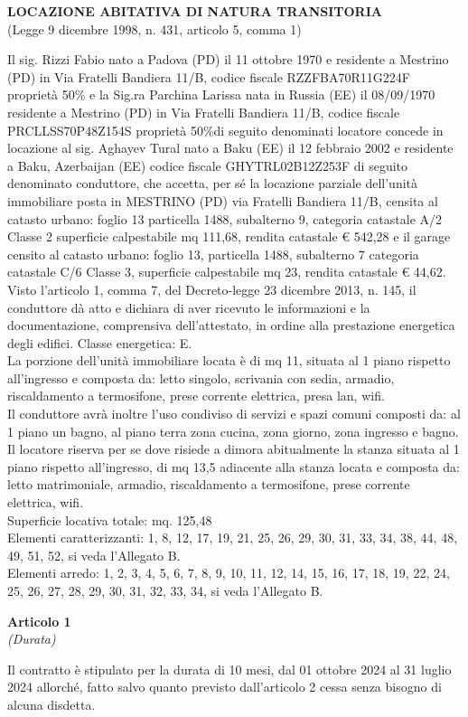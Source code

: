 \documentclass{contratto}
\begin{document}
\begin{center}
    \textbf{ LOCAZIONE ABITATIVA DI NATURA TRANSITORIA}\\
    \vspace{0.5cm}
   (Legge 9 dicembre 1998, n. 431, articolo 5, comma 1)
\end{center}

Il sig. Rizzi Fabio nato a Padova (PD) il 11 ottobre 1970 e residente a Mestrino (PD)  in Via Fratelli Bandiera 11/B, codice fiscale RZZFBA70R11G224F proprietà 50\% e la Sig.ra Parchina Larissa nata in Russia (EE) il 08/09/1970 residente a Mestrino (PD) in Via Fratelli Bandiera 11/B, codice fiscale PRCLLSS70P48Z154S proprietà 50\%di seguito denominati locatore concede in locazione al sig. Aghayev Tural nato a Baku (EE) il 12 febbraio 2002 e residente a Baku, Azerbaijan (EE) codice fiscale GHYTRL02B12Z253F di seguito denominato conduttore,  che accetta, per sé  la locazione parziale dell'unità immobiliare posta in MESTRINO (PD) via Fratelli Bandiera 11/B, censita al catasto urbano: foglio 13 particella 1488, subalterno 9, categoria catastale A/2 Classe 2 superficie calpestabile mq 111,68, rendita catastale € 542,28 e il garage censito al catasto urbano: foglio 13, particella 1488, subalterno 7 categoria catastale C/6 Classe 3, superficie calpestabile mq 23, rendita catastale € 44,62.
Visto l’articolo 1, comma 7, del Decreto-legge 23 dicembre 2013, n. 145, il conduttore dà atto e dichiara di aver ricevuto le informazioni e la documentazione, comprensiva dell'attestato, in ordine alla prestazione energetica degli edifici. Classe energetica: E.\\
La porzione dell’unità immobiliare locata è di mq 11, situata al 1 piano rispetto all'ingresso e composta da: letto singolo, scrivania con sedia, armadio, riscaldamento a termosifone, prese corrente elettrica, presa lan, wifi.\\
Il conduttore avrà inoltre l’uso condiviso di servizi e spazi comuni composti da: al 1 piano un bagno, al piano terra  zona cucina, zona giorno, zona ingresso e bagno.\\
Il locatore riserva per se dove risiede a dimora abitualmente la stanza situata al 1 piano rispetto all'ingresso, di mq 13,5 adiacente alla stanza locata e composta da: letto matrimoniale, armadio, riscaldamento a termosifone, prese corrente elettrica, wifi.\\
Superficie locativa totale: mq. 125,48\\
Elementi caratterizzanti: 1, 8, 12, 17, 19, 21, 25, 26, 29, 30, 31, 33, 34, 38, 44, 48, 49, 51, 52, si veda l'Allegato B. \\
Elementi arredo: 1, 2, 3, 4, 5, 6, 7, 8, 9, 10, 11, 12, 14, 15, 16, 17, 18, 19, 22, 24, 25, 26, 27, 28, 29, 30, 31, 32, 33, 34, si veda l'Allegato B.\\
\begin{center}
\textbf{\Large Articolo 1}\\
\textit{(Durata)}
\end{center}
Il contratto è stipulato per la durata di 10 mesi, dal 01 ottobre 2024 al 31 luglio 2024 allorché, fatto salvo quanto previsto dall’articolo 2 cessa senza bisogno di alcuna disdetta.
\end{document}
